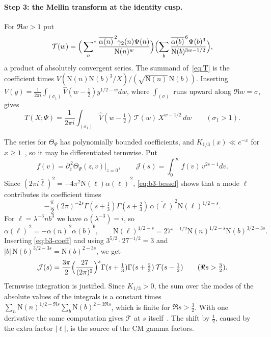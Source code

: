 \documentclass[11pt]{article}
\numberwithin{equation}{section}
\newcommand{\N}{\mathrm N}
\newcommand{\ssum}{\sideset{}{^*}\sum}
\begin{document}
\paragraph{Step 3: the Mellin transform at the identity cusp.} For
$\Re w>1$ put
\begin{equation}\label{eq:d106}
 \mathcal T(w)=\Bigl(\ssum_n\frac{\overline{\alpha(n)}^{\,2}\gamma_2(n)
 \Psi(n)}{\N(n)^w}\Bigr)
 \Bigl(\sum_b\frac{\overline{\alpha(b)}^{\,6}\Psi(b)^3}{\N(b)^{3w-1/2}}\Bigr),
\end{equation}
a product of absolutely convergent series. The summand
of~\eqref{eq:T} is the coefficient times
$V(\N(n)\N(b)^3/X)/(\sqrt{\N(n)}\,\N(b))$. Inserting
$V(y)=\frac1{2\pi i}\int_{(\sigma_1)}\widehat V(w-\frac12)y^{1/2-w}dw$,
where $\int_{(\sigma)}$ runs upward along $\Re w=\sigma$, gives
\begin{equation}\label{eq:b3-inversion}
 T(X;\Psi)=\frac1{2\pi i}\int_{(\sigma_1)}\widehat V(w-\tfrac12)\,
 \mathcal T(w)\,X^{w-1/2}\,dw\qquad(\sigma_1>1).
\end{equation}

The series for $\Theta_\Psi$ has polynomially bounded coefficients, and
$K_{1/3}(x)\ll e^{-x}$ for $x\ge1$~\cite[(10.25.3)]{DLMF}, so it may be differentiated termwise.
Put
\begin{equation}\label{eq:d107}
 f(v)=\partial_{\bar z}^{\,2}\Theta_\Psi(z,v)\big|_{z=0},\qquad
 \mathcal J(s)=\int_0^\infty f(v)\,v^{2s-1}dv.
\end{equation}
Since $(2\pi i\bar\ell)^2=-4\pi^2\N(\ell)\overline{\alpha(\ell)}^{\,2}$,
\eqref{eq:b3-bessel} shows that a mode $\ell$ contributes its coefficient
times
\begin{equation}\label{eq:b3-mode}
 -\frac\pi2(2\pi)^{-2s}\Gamma(s+\tfrac13)\Gamma(s+\tfrac23)\,
 \overline{\alpha(\ell)}^{\,2}\N(\ell)^{1/2-s}.
\end{equation}
For $\ell=\lambda^{-3}nb^3$ we have $\alpha(\lambda^{-3})=i$, so
\begin{equation}\label{eq:d108}
 \overline{\alpha(\ell)}^{\,2}
 =-\overline{\alpha(n)}^{\,2}\overline{\alpha(b)}^{\,6},\qquad
 \N(\ell)^{1/2-s}=27^{s-1/2}\N(n)^{1/2-s}\N(b)^{3/2-3s}.
\end{equation}
Inserting
\eqref{eq:b3-coeff} and using $3^{5/2}\cdot27^{-1/2}=3$ and
$|b|\,\N(b)^{3/2-3s}=\N(b)^{2-3s}$, we get
\begin{equation}\label{eq:b3-J}
 \mathcal J(s)=\frac{3\pi}2\Bigl(\frac{27}{(2\pi)^2}\Bigr)^s
 \Gamma(s+\tfrac13)\Gamma(s+\tfrac23)\,\mathcal T(s-\tfrac12)
 \qquad(\Re s>\tfrac32).
\end{equation}
Termwise integration is justified. Since $K_{1/3}>0$, the sum over the
modes of the absolute values of the integrals is a constant times
$\sum_n\N(n)^{1/2-\Re s}\sum_b\N(b)^{2-3\Re s}$, which is finite for
$\Re s>\frac32$. With one derivative the same computation gives
$\mathcal T$ at $s$ itself~\cite[(A.16)]{OAI1112}. The shift by
$\frac12$, caused by the extra factor $|\ell|$, is the source of the CM
gamma factors.
\end{document}
